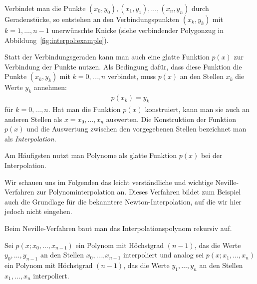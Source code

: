 \documentclass{article}
\begin{document}
Verbindet man die Punkte $(x_0,y_0), (x_1,y_1),\ldots,(x_n,y_n)$
durch Geradenstücke, so entstehen an den Verbindungspunkten
$(x_k,y_k)$ mit $k=1,\ldots,n-1$ unerwünschte Knicke (siehe 
verbindender Polygonzug in Abbildung~\ref{fig:interpol:example}).

Statt der Verbindungsgeraden kann man auch eine glatte Funktion $p(x)$
zur Verbindung der Punkte nutzen. Als Bedingung dafür, dass diese Funktion die Punkte
$(x_k,y_k)$ mit $k=0,\ldots,n$ verbindet, muss $p(x)$ an den Stellen $x_k$ die Werte $y_k$ annehmen:
\begin{align*}
  p(x_k) = y_k
\end{align*}
für $k=0,\ldots,n$. Hat man die Funktion $p(x)$
konstruiert, kann man sie auch an anderen Stellen als
$x=x_0,\ldots,x_n$ auswerten. Die Konstruktion der Funktion $p(x)$ und
die Auswertung zwischen den vorgegebenen Stellen bezeichnet man als \emph{Interpolation}.

Am Häufigsten nutzt man Polynome als glatte Funktion $p(x)$ bei der
Interpolation.

Wir schauen uns im Folgenden das leicht verständliche und wichtige
Neville-Verfahren zur Polynominterpolation an. Dieses Verfahren bildet
zum Beispiel auch die Grundlage für die bekanntere
Newton-Interpolation, auf die wir hier jedoch nicht eingehen.

Beim Neville-Verfahren baut man das Interpolationspolynom
rekursiv auf.

Sei $p(x;x_0,\ldots,x_{n-1})$ ein Polynom mit Höchstgrad $(n-1)$, das
die Werte $y_0,\ldots,y_{n-1}$ an den Stellen $x_0,\ldots,x_{n-1}$
interpoliert und analog sei $p(x;x_1,\ldots,x_n)$ ein Polynom mit
Höchstgrad $(n-1)$, das die Werte $y_1,\ldots,y_n$ an den Stellen
$x_1,\ldots,x_n$ interpoliert.
\end{document}
